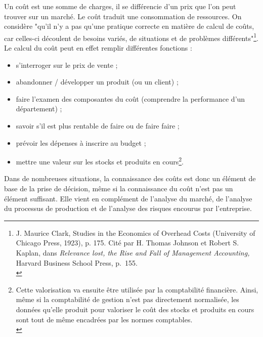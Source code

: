 \documentclass{kaobook}
\begin{document}
Un coût est une somme de charges, il se différencie d'un prix que l'on peut trouver sur un marché. Le coût traduit une consommation de ressources. On considère "qu'il n'y a pas qu'une pratique correcte en matière de calcul de coûts, car celles-ci découlent de besoins variés, de situations et de problèmes différents"\footnote{J. Maurice Clark, Studies in the Economics of Overhead Costs (University of Chicago Press, 1923), p. 175. Cité par H. Thomas Johnson et Robert S. Kaplan, dans \emph{Relevance lost, the Rise and Fall of Management Accounting,} Harvard Business School Press, p. 155.\\}. Le calcul du coût peut en effet remplir différentes fonctions :\\
\begin{itemize}
\item s’interroger sur le prix de vente ;\\
\item abandonner / développer un produit (ou un client) ;\\
\item faire l’examen des composantes du coût (comprendre la performance d’un département) ;\\
\item savoir s’il est plus rentable de faire ou de faire faire ;\\
\item prévoir les dépenses à inscrire au budget ;\\
\item mettre une valeur sur les stocks et produits en cours\footnote{Cette valorisation va ensuite être utilisée par la comptabilité financière. Ainsi, même si la comptabilité de gestion n'est pas directement normalisée, les données qu'elle produit pour valoriser le coût des stocks et produits en cours sont tout de même encadrées par les normes comptables.\\}.\\
\end{itemize}

Dans de nombreuses situations, la connaissance des coûts est donc un élément de base de la prise de décision, même si la connaissance du coût n'est pas un élément suffisant. Elle vient en complément de l'analyse du marché, de l'analyse du processus de production et de l'analyse des risques encourus par l'entreprise.\\
\end{document}
